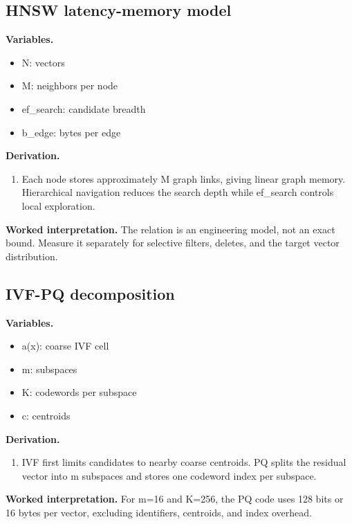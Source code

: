 \subsection{HNSW latency-memory model}
\textbf{Variables.}\begin{itemize}
\item N: vectors
\item M: neighbors per node
\item ef\_search: candidate breadth
\item b\_edge: bytes per edge
\end{itemize}
\textbf{Derivation.}\begin{derivation}\begin{enumerate}
\item Each node stores approximately M graph links, giving linear graph memory. Hierarchical navigation reduces the search depth while ef\_search controls local exploration.
\end{enumerate}\end{derivation}
\textbf{Worked interpretation.} The relation is an engineering model, not an exact bound. Measure it separately for selective filters, deletes, and the target vector distribution.
\subsection{IVF-PQ decomposition}
\textbf{Variables.}\begin{itemize}
\item a(x): coarse IVF cell
\item m: subspaces
\item K: codewords per subspace
\item c: centroids
\end{itemize}
\textbf{Derivation.}\begin{derivation}\begin{enumerate}
\item IVF first limits candidates to nearby coarse centroids. PQ splits the residual vector into m subspaces and stores one codeword index per subspace.
\end{enumerate}\end{derivation}
\textbf{Worked interpretation.} For m=16 and K=256, the PQ code uses 128 bits or 16 bytes per vector, excluding identifiers, centroids, and index overhead.
